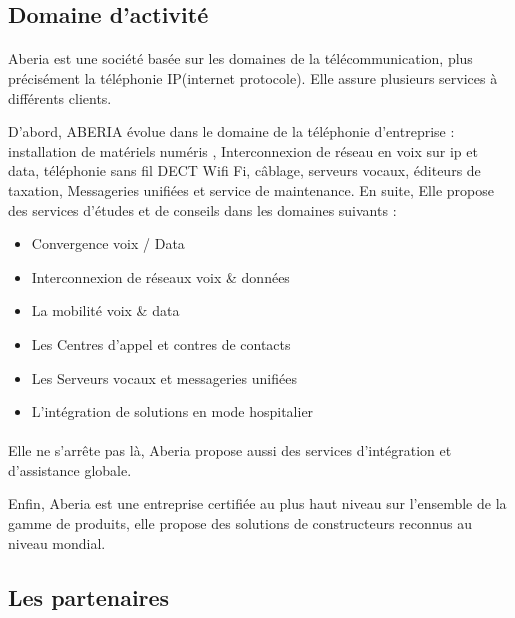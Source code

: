 \documentclass[a4paper,12pt]{report}
\begin{document}
\subsection{Domaine d’activité}
\paragraph*{}

        Aberia est une société basée sur les domaines de la télécommunication, plus précisément  la téléphonie IP(internet protocole). 
        Elle assure plusieurs services à différents clients.\newline
       
       D’abord,  ABERIA évolue dans le domaine de la téléphonie d’entreprise : installation de matériels numéris , Interconnexion de réseau en voix sur ip et data, téléphonie sans fil DECT Wifi Fi, câblage, serveurs vocaux, éditeurs de taxation, Messageries unifiées et service de maintenance.\newline
       En suite, Elle propose des services d'études et de conseils dans les domaines suivants :
\newline
\begin{itemize}
 \item    Convergence voix / Data 
 \item   Interconnexion de réseaux voix \& données 
 \item   La mobilité voix \& data 
 \item  Les Centres d’appel et contres de contacts 
 \item  Les Serveurs vocaux et messageries unifiées 
 \item L’intégration de solutions en mode hospitalier 
\end{itemize}

\paragraph*{}
       Elle ne s’arrête pas là,  Aberia propose aussi des services d'intégration et d'assistance globale.\newline
       
       Enfin, Aberia est une entreprise certifiée au plus haut niveau sur l’ensemble de la gamme de produits, elle  propose des solutions de constructeurs reconnus au niveau mondial.
\subsection{Les partenaires}
\end{document}
